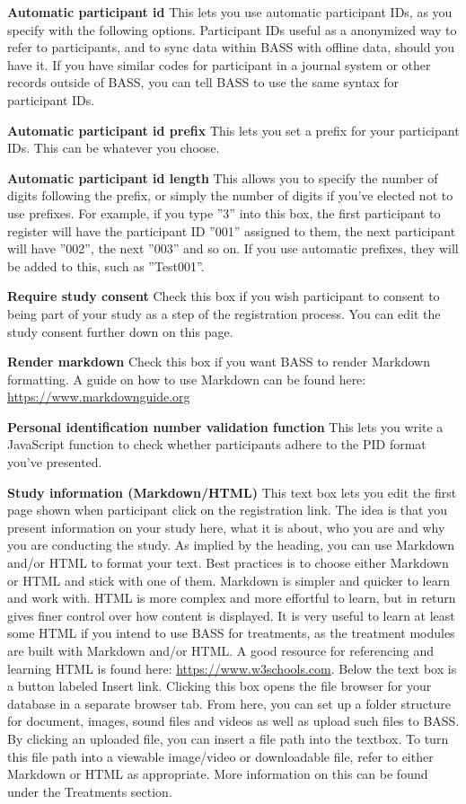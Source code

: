\documentclass[]{book}
\begin{document}
\textbf{Automatic participant id}
This lets you use automatic participant IDs, as you specify with the following options. Participant IDs useful as a anonymized way to refer to participants, and to sync data within BASS with offline data, should you have it. If you have similar codes for participant in a journal system or other records outside of BASS, you can tell BASS to use the same syntax for participant IDs.

\textbf{Automatic participant id prefix}
This lets you set a prefix for your participant IDs. This can be whatever you choose.

\textbf{Automatic participant id length}
This allows you to specify the number of digits following the prefix, or simply the number of digits if you've elected not to use prefixes. For example, if you type ''3'' into this box, the first participant to register will have the participant ID ''001'' assigned to them, the next participant will have ''002'', the next ''003'' and so on. If you use automatic prefixes, they will be added to this, such as ''Test001''.

\textbf{Require study consent}
Check this box if you wish participant to consent to being part of your study as a step of the registration process. You can edit the study consent further down on this page.

\textbf{Render markdown}
Check this box if you want BASS to render Markdown formatting. A guide on how to use Markdown can be found here: \url{https://www.markdownguide.org}

\textbf{Personal identification number validation function}
This lets you write a JavaScript function to check whether participants adhere to the PID format you've presented.

\textbf{Study information (Markdown/HTML)}
This text box lets you edit the first page shown when participant click on the registration link. The idea is that you present information on your study here, what it is about, who you are and why you are conducting the study.
As implied by the heading, you can use Markdown and/or HTML to format your text. Best practices is to choose either Markdown or HTML and stick with one of them. Markdown is simpler and quicker to learn and work with. HTML is more complex and more effortful to learn, but in return gives finer control over how content is displayed.
It is very useful to learn at least some HTML if you intend to use BASS for treatments, as the treatment modules are built with Markdown and/or HTML.
A good resource for referencing and learning HTML is found here: \url{https://www.w3schools.com}.
Below the text box is a button labeled Insert link. Clicking this box opens the file browser for your database in a separate browser tab. From here, you can set up a folder structure for document, images, sound files and videos as well as upload such files to BASS. By clicking an uploaded file, you can insert a file path into the textbox. To turn this file path into a viewable image/video or downloadable file, refer to either Markdown or HTML as appropriate. More information on this can be found under the Treatments section.
\end{document}
